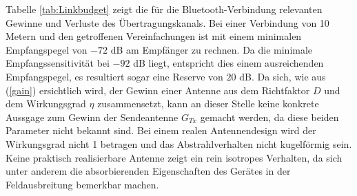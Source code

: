 Tabelle \ref{tab:Linkbudget} zeigt die für die Bluetooth-Verbindung relevanten Gewinne und Verluste des Übertragungskanals. Bei einer Verbindung von 10 Metern und den getroffenen Vereinfachungen ist mit einem minimalen Empfangspegel von $-72$ dB am Empfänger zu rechnen. Da die minimale Empfangssensitivität bei $-92$ dB liegt, entspricht dies einem ausreichenden Empfangspegel, es resultiert sogar eine Reserve von $20$ dB. Da sich, wie aus (\ref{gain}) ersichtlich wird, der Gewinn einer Antenne aus dem Richtfaktor $D$ und dem Wirkungsgrad $\eta$ zusammensetzt, kann an dieser Stelle keine konkrete Aussgage zum Gewinn der Sendeantenne $G_{Tx}$ gemacht werden, da diese beiden Parameter nicht bekannt sind. Bei einem realen Antennendesign wird der Wirkungsgrad nicht 1 betragen und das Abstrahlverhalten nicht kugelförmig sein. Keine praktisch realisierbare Antenne zeigt ein rein isotropes Verhalten, da sich unter anderem die absorbierenden Eigenschaften des  Gerätes in der Feldausbreitung bemerkbar machen. 


